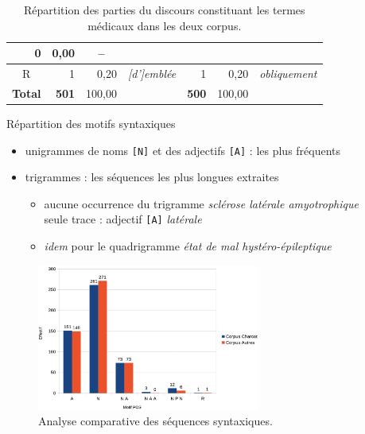 \begin{frame}
\begin{table}[h]
{\begin{tabular}{|lrrr|rrl|}
					\multicolumn{1}{r|}{0}                 & \multicolumn{1}{r|}{0,00}           &
					\multicolumn{1}{c|}{--}         \\ \hline
					\multicolumn{1}{|c|}{\textsc{R}}              & \multicolumn{1}{r|}{1}                 & \multicolumn{1}{r|}{0,20}                    &
					\multicolumn{1}{c|}{\textit{[d']emblée}} &
					\multicolumn{1}{r|}{1}                 & \multicolumn{1}{r|}{0,20}       &
					\multicolumn{1}{c|}{\textit{obliquement}}             \\ \hline\hline
					\multicolumn{1}{|c|}{\textbf{Total}} & \multicolumn{1}{r|}{\textbf{501}}      & \multicolumn{1}{r|}{100,00}                  &
					\multicolumn{1}{r|}{\cellcolor{blue!25}} &
					\multicolumn{1}{r|}{\textbf{500}}      & \multicolumn{1}{r|}{100,00} &
					\multicolumn{1}{r|}{\cellcolor{blue!25}}                 \\ \hline\hline
				\end{tabular}
			}
			\caption{Répartition des parties du discours constituant les termes médicaux dans les deux corpus.}
			\label{tab:repartition_POS}
		\end{table}
	\end{frame}
	
	
	\begin{frame}{Répartition des motifs syntaxiques}
		
		\begin{itemize}
			\item unigrammes de noms \texttt{[N]} et des adjectifs \texttt{[A]} : les plus fréquents
			\item trigrammes : les séquences les plus longues extraites
			\begin{itemize}
				\item aucune occurrence du trigramme \textit{sclérose latérale amyotrophique}\\\textcolor{deepred}{seule trace : adjectif \texttt{[A]} \textit{latérale}}
				\item \textit{idem} pour le quadrigramme \textit{état de mal hystéro-épileptique}
			\end{itemize}
			
		\end{itemize}
		
		\begin{figure}[!h]
			\centering
			\includegraphics[width=0.65\textwidth]{pic/repartition_motifs_POS.png}
			\caption{Analyse comparative des séquences syntaxiques.}
		\end{figure}
		
	\end{frame}
	
